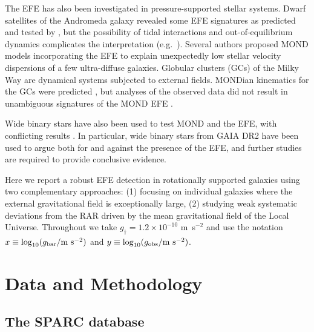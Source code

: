 \documentclass[twocolumn,tighten]{aastex63}
\begin{document}
The EFE has also been investigated in pressure-supported stellar systems. Dwarf satellites of the Andromeda galaxy revealed some EFE signatures as predicted and tested by \cite{MM13a,MM13b}, but the possibility of tidal interactions and out-of-equilibrium dynamics complicates the interpretation (e.g.\ \citealt{MW10,Lel17}). Several authors \citep{FMM18,Krou18,Mul19,Hag19} proposed MOND models incorporating the EFE to explain unexpectedly low stellar velocity dispersions of a few ultra-diffuse galaxies. Globular clusters (GCs) of the Milky Way are dynamical systems subjected to external fields. MONDian kinematics for the GCs were predicted \citep{Baum05,Hag09,Hag11}, but analyses of the observed data did not result in unambiguous signatures of the MOND EFE \citep{Jor09,Fra12}.

Wide binary stars have also been used to test MOND and the EFE, with conflicting results \citep{Her12,PS19,Her19}. In particular, wide binary stars from GAIA DR2 have been used to argue both for \citep{PS19} and against \citep{Her19} the presence of the EFE, and further studies are required to provide conclusive evidence.

Here we report a robust EFE detection in rotationally supported galaxies using two complementary approaches: (1) focusing on individual galaxies where the external gravitational field is exceptionally large, (2) studying weak systematic deviations from the RAR driven by the mean gravitational field of the Local Universe. Throughout we take $g_\dagger=1.2\times 10^{-10}$ m~s$^{-2}$ \citep{MLS,Lel17} and use the notation $x\equiv \log_{\rm 10} (g_{\rm bar}/{\rm m~s^{-2}})$ and $y\equiv \log_{\rm 10} (g_{\rm obs}/{\rm m~s^{-2}})$.

\section{Data and Methodology} \label{sec:method}

\subsection{The SPARC database} \label{sec:sparc}
\end{document}
